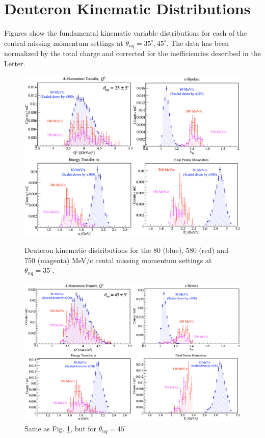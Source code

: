 \documentclass[aps, prl]{revtex4-2}  %
\begin{document}
\section{\large Deuteron Kinematic Distributions }
\noindent Figures show the fundamental kinematic variable distributions for each of the central missing momentum settings at $\theta_{nq}=35^{\circ}, 45^{\circ}$.
The data has been normalized by the total charge and corrected for the inefficiencies described in the Letter.  
\begin{figure}[!h]
\includegraphics[scale=0.4]{plots/d2_kin_thnq35.png}
\caption{Deuteron kinematic distributions for the 80 (blue), 580 (red) and 750 (magenta) MeV/c cental missing momentum settings at $\theta_{nq}=35^{\circ}$.}
\label{fig:fig8}
\includegraphics[scale=0.35]{plots/d2_kin_thnq45.png}
\caption{Same as Fig. \ref{}, but for $\theta_{nq}=45^{\circ}$}
\label{fig:fig9}
\end{figure}
\clearpage
\end{document}
